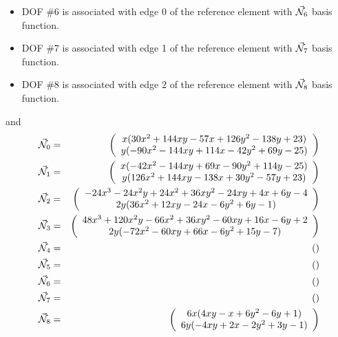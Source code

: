 \begin{itemize}
\begin{itemize}
\item DOF \#6 is associated with edge 0 of the reference element with $\vec{{\mathcal{N}}}_6$ basis function.
\item DOF \#7 is associated with edge 1 of the reference element with $\vec{{\mathcal{N}}}_7$ basis function.
\item DOF \#8 is associated with edge 2 of the reference element with $\vec{{\mathcal{N}}}_8$ basis function.
\end{itemize}
and
\begin{eqnarray}
\vec{{\mathcal{N}}}_0 &=&  \left(\begin{array}{c} 
x(30x^2+144xy-57x+126y^2-138y+23) \\ 
y(-90x^2-144xy+114x-42y^2+69y-25) 
\end{array}\right) \nonumber\\  
\vec{{\mathcal{N}}}_1 &=&  \left(\begin{array}{c}  
x(-42x^2-144xy+69x-90y^2+114y-25)\\
y(126x^2+144xy-138x+30y^2-57y+23)
\end{array}\right) \nonumber\\  
\vec{{\mathcal{N}}}_2 &=&  \left(\begin{array}{c}  
-24x^3-24x^2y+24x^2+36xy^2-24xy+4x+6y-4\\
2y(36x^2+12xy-24x-6y^2+6y-1)
\end{array}\right) \nonumber\\  
\vec{{\mathcal{N}}}_3 &=&  \left(\begin{array}{c}  
48x^3+120x^2y-66x^2+36xy^2-60xy+16x-6y+2 \\
2y(-72x^2-60xy+66x-6y^2+15y-7)
\end{array}\right) \nonumber\\  
\vec{{\mathcal{N}}}_4 &=&  \left(\begin{array}{c}  
\end{array}\right) \nonumber\\  
\vec{{\mathcal{N}}}_5 &=&  \left(\begin{array}{c}  
\end{array}\right) \nonumber\\
\vec{{\mathcal{N}}}_6 &=&  \left(\begin{array}{c}  
\end{array}\right) \nonumber\\
\vec{{\mathcal{N}}}_7 &=&  \left(\begin{array}{c}  
\end{array}\right) \nonumber\\
\vec{{\mathcal{N}}}_8 &=&  \left(\begin{array}{c} 
6x(4xy-x+6y^2-6y+1) \\ 
6y(-4xy+2x-2y^2+3y-1) 
\end{array}\right) \nonumber
\end{eqnarray}


\end{itemize}
